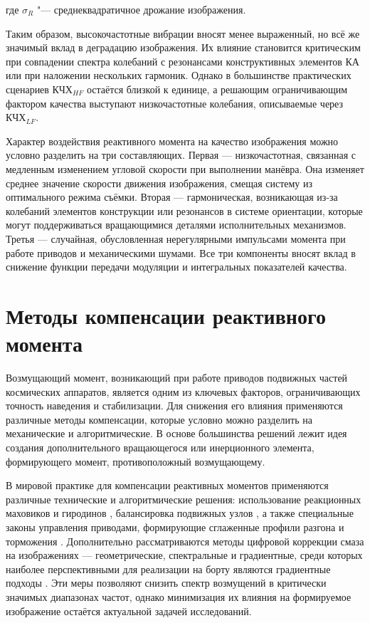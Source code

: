 где \(\sigma_R\) "--- среднеквадратичное дрожание изображения.


Таким образом, высокочастотные вибрации вносят менее выраженный, но всё же значимый вклад в деградацию изображения. Их влияние становится критическим при совпадении спектра колебаний с резонансами конструктивных элементов КА или при наложении нескольких гармоник. Однако в большинстве практических сценариев $\text{КЧХ}_{HF}$ остаётся близкой к единице, а решающим ограничивающим фактором качества выступают низкочастотные колебания, описываемые через $\text{КЧХ}_{LF}$.

Характер воздействия реактивного момента на качество изображения можно условно разделить на три составляющих. Первая — низкочастотная, связанная с медленным изменением угловой скорости при выполнении манёвра. Она изменяет среднее значение скорости движения изображения, смещая систему из оптимального режима съёмки. Вторая — гармоническая, возникающая из-за колебаний элементов конструкции или резонансов в системе ориентации, которые могут поддерживаться вращающимися деталями исполнительных механизмов. Третья — случайная, обусловленная нерегулярными импульсами момента при работе приводов и механическими шумами. Все три компоненты вносят вклад в снижение функции передачи модуляции и интегральных показателей качества.

\section{Методы компенсации реактивного момента}
Возмущающий момент, возникающий при работе приводов подвижных частей космических аппаратов, является одним из ключевых факторов, ограничивающих точность наведения и стабилизации. Для снижения его влияния применяются различные методы компенсации, которые условно можно разделить на механические и алгоритмические. В основе большинства решений лежит идея создания дополнительного вращающегося или инерционного элемента, формирующего момент, противоположный возмущающему.

В мировой практике для компенсации реактивных моментов применяются различные технические и алгоритмические решения: использование реакционных маховиков и гиродинов \cite{pittelkau2012pointing, dennehy2021spacecraft}, балансировка подвижных узлов \cite{alvarez2018spacecraft}, а также специальные законы управления приводами, формирующие сглаженные профили разгона и торможения \cite{lappas2002attitude, zhao2023effect}. Дополнительно рассматриваются методы цифровой коррекции смаза на изображениях — геометрические, спектральные и градиентные, среди которых наиболее перспективными для реализации на борту являются градиентные подходы \cite{volobuev2021dissertation}. Эти меры позволяют снизить спектр возмущений в критически значимых диапазонах частот, однако минимизация их влияния на формируемое изображение остаётся актуальной задачей исследований.

